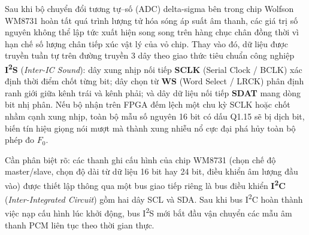 \begin{physicalinsight}
Sau khi bộ chuyển đổi tương tự--số (ADC) delta-sigma bên trong chip Wolfson WM8731 hoàn tất quá trình lượng tử hóa sóng áp suất âm thanh, các giá trị số nguyên không thể lập tức xuất hiện song song trên hàng chục chân đồng thời vì hạn chế số lượng chân tiếp xúc vật lý của vỏ chip. Thay vào đó, dữ liệu được truyền tuần tự trên đường truyền 3 dây theo giao thức tiêu chuẩn công nghiệp \textbf{I\textsuperscript{2}S} (\emph{Inter-IC Sound}): dây xung nhịp nối tiếp \textbf{SCLK} (Serial Clock / BCLK) xác định thời điểm chốt từng bit; dây chọn từ \textbf{WS} (Word Select / LRCK) phân định ranh giới giữa kênh trái và kênh phải; và dây dữ liệu nối tiếp \textbf{SDAT} mang dòng bit nhị phân. Nếu bộ nhận trên FPGA đếm lệch một chu kỳ SCLK hoặc chốt nhầm cạnh xung nhịp, toàn bộ mẫu số nguyên 16 bit có dấu Q1.15 sẽ bị dịch bit, biến tín hiệu giọng nói mượt mà thành xung nhiễu nổ cực đại phá hủy toàn bộ phép đo $F_0$.
\end{physicalinsight}

Cần phân biệt rõ: các thanh ghi cấu hình của chip WM8731 (chọn chế độ master/slave, chọn độ dài từ dữ liệu 16 bit hay 24 bit, điều khiển âm lượng đầu vào) được thiết lập thông qua một bus giao tiếp riêng là bus điều khiển \textbf{I\textsuperscript{2}C} (\emph{Inter-Integrated Circuit}) gồm hai dây SCL và SDA. Sau khi bus I\textsuperscript{2}C hoàn thành việc nạp cấu hình lúc khởi động, bus I\textsuperscript{2}S mới bắt đầu vận chuyển các mẫu âm thanh PCM liên tục theo thời gian thực.


